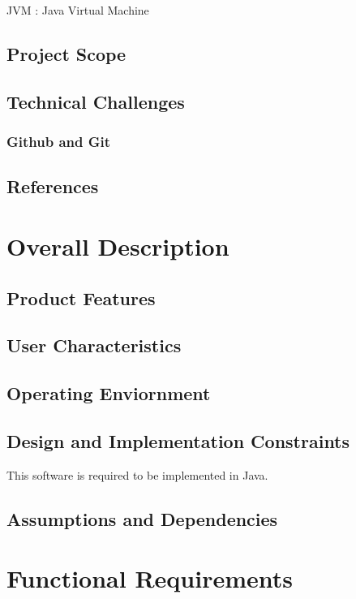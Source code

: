 \documentclass[12pt]{article}
\begin{document}
JVM : Java Virtual Machine 

\subsection{Project Scope}

\subsection{Technical Challenges}
\subsubsection{Github and Git}

\subsection{References}

\section{Overall Description}
\subsection{Product Features}


\subsection{User Characteristics}

\subsection{Operating Enviornment}\label{operating-enviornment}

\subsection{Design and Implementation
Constraints}\label{design-and-implementation-constraints}

This software is required to be implemented in Java. 
\subsection{Assumptions and Dependencies}

\section{Functional Requirements}\label{functional-requirements}
\end{document}
